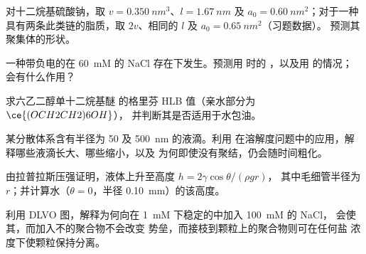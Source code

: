 \begin{exercise}[$\star\star$]\label{exo:b3:colloids:7}
对十二烷基硫酸钠，取 $v = \qty{0.350}{nm^3}$、$l = \qty{1.67}{nm}$ 及 $a_0 = \qty{0.60}{nm^2}$；对于一种
具有两条此类链的脂质，取 $2v$、相同的 $l$ 及 $a_0 = \qty{0.65}{nm^2}$（习题数据）。
预测其聚集体的形状。
\end{exercise}

\begin{exercise}[$\star\star$]\label{exo:b3:colloids:8}
一种带负电的在 \qty{60}{mM} 的 NaCl 存在下发生。预测用  时的
，以及用  的情况； 会有什么作用？
\end{exercise}

\begin{exercise}[$\star\star$]\label{exo:b3:colloids:9}
求六乙二醇单十二烷基醚
 的格里芬 HLB 值（亲水部分为 $\ce{(OCH2CH2)6OH}$），
并判断其是否适用于水包油。
\end{exercise}

\begin{exercise}[$\star\star\star$]\label{exo:b3:colloids:10}
某分散体系含有半径为 50 及 \qty{500}{nm} 的液滴。利用
在溶解度问题中的应用，解释哪些液滴长大、哪些缩小，以及
为何即使没有聚结，仍会随时间粗化。
\end{exercise}

\begin{exercise}[$\star\star\star$]\label{exo:b3:colloids:11}
由拉普拉斯压强证明，液体上升至高度 $h = 2\gamma\cos\theta/(\rho gr)$，
其中毛细管半径为 $r$；并计算水（$\theta = 0$，半径 \qty{0.10}{mm}）的该高度。
\end{exercise}

\begin{exercise}[$\star\star\star$]\label{exo:b3:colloids:12}
利用 DLVO 图，解释为何向在 \qty{1}{mM} 下稳定的中加入 \qty{100}{mM} 的 NaCl，
会使其，而加入不的聚合物不会改变
势垒，而接枝到颗粒上的聚合物则可在任何盐
浓度下使颗粒保持分离。
\end{exercise}

\clearpage
\enlargethispage{3\baselineskip}
